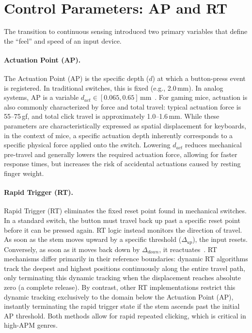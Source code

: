 \section{Control Parameters: AP and RT}

The transition to continuous sensing introduced two primary variables that define the \enquote{feel} and speed of an input device.

\paragraph{Actuation Point (AP).}
The Actuation Point (AP) is the specific depth ($d$) at which a button-press event is registered. In traditional switches, this is fixed (e.g., 2.0\,mm). In analog systems, AP is a variable $d_{act} \in [0.065, 0.65]$\,mm~\cite{digitec_logitech_clickery_2024}. For gaming mice, actuation is also commonly characterized by force and total travel: typical actuation force is 55--75\,gf, and total click travel is approximately 1.0--1.6\,mm. While these parameters are characteristically expressed as spatial displacement for keyboards, in the context of mice, a specific actuation depth inherently corresponds to a specific physical force applied onto the switch. Lowering $d_{act}$ reduces mechanical pre-travel and generally lowers the required actuation force, allowing for faster response times, but increases the risk of accidental actuations caused by resting finger weight.

\paragraph{Rapid Trigger (RT).}
Rapid Trigger (RT) eliminates the fixed reset point found in mechanical switches. In a standard switch, the button must travel back up past a specific reset point before it can be pressed again. RT logic instead monitors the direction of travel. As soon as the stem moves upward by a specific threshold ($\Delta_{up}$), the input resets. Conversely, as soon as it moves back down by $\Delta_{down}$, it reactuates~\cite{wooting_rapid_trigger}. RT mechanisms differ primarily in their reference boundaries: dynamic RT algorithms track the deepest and highest positions continuously along the entire travel path, only terminating this dynamic tracking when the displacement reaches absolute zero (a complete release). By contrast, other RT implementations restrict this dynamic tracking exclusively to the domain below the Actuation Point (AP), instantly terminating the rapid trigger state if the stem ascends past the initial AP threshold. Both methods allow for rapid repeated clicking, which is critical in high-APM genres.

